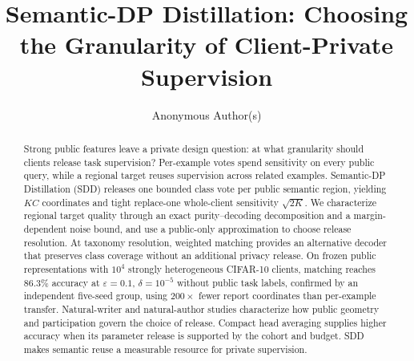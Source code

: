 \documentclass[sigconf,anonymous,review,balance=false]{acmart}
\begin{document}
\title[Semantic-DP Distillation]{Semantic-DP Distillation: Choosing the Granularity
of Client-Private Supervision}

\author{Anonymous Author(s)}

\begin{abstract}
Strong public features leave a private design question: at what granularity
should clients release task supervision? Per-example votes spend sensitivity
on every public query, while a regional target reuses supervision across related
examples. Semantic-DP Distillation (SDD) releases one bounded class vote per
public semantic region, yielding $KC$ coordinates and tight replace-one
whole-client sensitivity $\sqrt{2K}$. We characterize regional target quality
through an exact purity--decoding decomposition and a margin-dependent noise
bound, and use a public-only approximation to choose release resolution.
At taxonomy resolution, weighted matching provides an alternative decoder
that preserves class coverage without an additional privacy release.
On frozen public representations with $10^4$ strongly heterogeneous CIFAR-10
clients, matching reaches $86.3\%$ accuracy at $\varepsilon=0.1$,
$\delta=10^{-5}$ without public task labels, confirmed by an independent
five-seed group, using $200\times$ fewer report coordinates than per-example
transfer. Natural-writer and natural-author studies characterize how public
geometry and participation govern the choice of release. Compact head averaging
supplies higher accuracy when its parameter release is supported by the cohort
and budget. SDD makes semantic reuse a measurable resource for private supervision.
\end{abstract}




\maketitle
\makeatletter
{}
\makeatother









\clearpage




\end{document}
